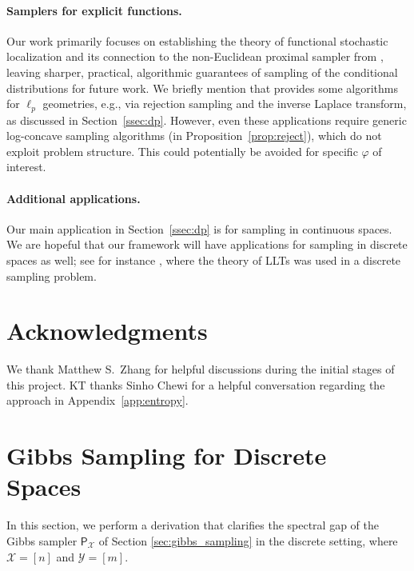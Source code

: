 \documentclass[11pt]{article}
\newcommand{\0}{\mathbf{0}}
\newcommand{\1}{\mathbf{1}}
\newcommand{\calX}{\mathcal{X}}
\newcommand{\calY}{\mathcal{Y}}
\newcommand{\sfP}{\mathsf{P}}
\newcommand{\vhi}{\varphi}
\begin{document}
\paragraph{Samplers for explicit functions.} Our work primarily  focuses on establishing the theory of functional stochastic localization and its connection to the non-Euclidean proximal sampler from \cite{GopiLLST25}, leaving sharper, practical, algorithmic guarantees of sampling of the conditional distributions for future work. We briefly mention that \cite{GopiLLST25} provides some algorithms for $\ell_p$ geometries, e.g., via rejection sampling and the inverse Laplace transform, as discussed in Section~\ref{ssec:dp}. However, even these applications require generic log-concave sampling algorithms (in Proposition~\ref{prop:reject}), which do not exploit problem structure. This could potentially be avoided for specific $\vhi$ of interest.

\paragraph{Additional applications.} Our main application in Section~\ref{ssec:dp} is for sampling in continuous spaces. We are hopeful that our framework will have applications for sampling in discrete spaces as well; see for instance \cite{AnariHLVXY23}, where the theory of LLTs was used in a discrete sampling problem.






\section*{Acknowledgments}
We thank Matthew S.\ Zhang for helpful discussions during the initial stages of this project. KT thanks Sinho Chewi for a helpful conversation regarding the approach in Appendix~\ref{app:entropy}.
\newpage



\appendix
\section{Gibbs Sampling for Discrete Spaces}\label{app:gibbs_sampling_discrete}

In this section, we perform a derivation that clarifies the spectral gap of the Gibbs sampler $\sfP_\calX$ of Section \ref{sec:gibbs_sampling} in the discrete setting, where $\calX = [n]$ and $\calY = [m]$.
\end{document}
